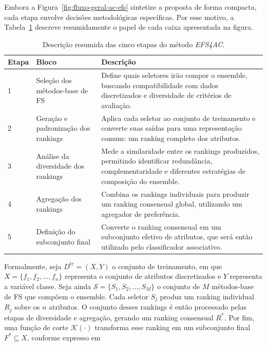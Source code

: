 Embora a Figura~\ref{fig:fluxo-geral-ac-efs} sintetize a proposta de forma
compacta, cada etapa envolve decisões metodológicas específicas. Por esse
motivo, a Tabela~\ref{tab:descricao-etapas-ac-efs} descreve resumidamente o
papel de cada caixa apresentada na figura.

\begin{table}[ht]
    \centering
    \small
    \caption{Descrição resumida das cinco etapas do método \textit{EFS4AC}.}
    \label{tab:descricao-etapas-ac-efs}
    \begin{tabular}{p{1.3cm}p{3.5cm}p{8.8cm}}
        \hline
        \textbf{Etapa} & \textbf{Bloco} & \textbf{Descrição} \\
        \hline
        1 & Seleção dos métodos-base de FS & Define quais seletores irão compor o ensemble, buscando compatibilidade com dados discretizados e diversidade de critérios de avaliação. \\
        2 & Geração e padronização dos rankings & Aplica cada seletor ao conjunto de treinamento e converte suas saídas para uma representação comum: um ranking completo dos atributos. \\
        3 & Análise da diversidade dos rankings & Mede a similaridade entre os rankings produzidos, permitindo identificar redundância, complementaridade e diferentes estratégias de composição do ensemble. \\
        4 & Agregação dos rankings & Combina os rankings individuais para produzir um ranking consensual global, utilizando um agregador de preferência. \\
        5 & Definição do subconjunto final & Converte o ranking consensual em um subconjunto efetivo de atributos, que será então utilizado pelo classificador associativo. \\
        \hline
    \end{tabular}
\end{table}

Formalmente, seja $D^{tr}=(X,Y)$ o conjunto de treinamento, em que
$X=\{f_1,f_2,\ldots,f_n\}$ representa o conjunto de atributos discretizados e
$Y$ representa a variável classe. Seja ainda
$\mathcal{S}=\{S_1,S_2,\ldots,S_M\}$ o conjunto de $M$ métodos-base de FS que
compõem o ensemble. Cada seletor $S_j$ produz um ranking individual $R_j$ sobre
os $n$ atributos. O conjunto desses rankings é então processado pelas etapas de
diversidade e agregação, gerando um ranking consensual $R^{*}$. Por fim, uma
função de corte $\mathcal{K}(\cdot)$ transforma esse ranking em um subconjunto
final $F^{*}\subseteq X$, conforme expresso em

